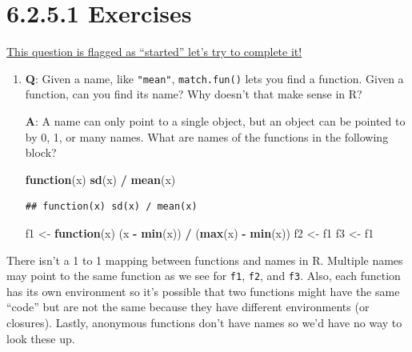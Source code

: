 \documentclass[]{book}
\newenvironment{Shaded}{\begin{snugshade}}{\end{snugshade}}
\newcommand{\ControlFlowTok}[1]{\textcolor[rgb]{0.13,0.29,0.53}{\textbf{#1}}}
\newcommand{\KeywordTok}[1]{\textcolor[rgb]{0.13,0.29,0.53}{\textbf{#1}}}
\newcommand{\NormalTok}[1]{#1}
\newcommand{\OperatorTok}[1]{\textcolor[rgb]{0.81,0.36,0.00}{\textbf{#1}}}
\newcommand{\StringTok}[1]{\textcolor[rgb]{0.31,0.60,0.02}{#1}}
\begin{document}
\hypertarget{exercises-2}{%
\section*{6.2.5.1 Exercises}\label{exercises-2}}

\href{https://github.com/Tazinho/Advanced-R-Solutions/blob/5043d9b06c7469a010c568ecb85e12bedca75207/2-06-Functions.Rmd\#L9}{This question is flagged as ``started'' let's try to complete it!}

\begin{enumerate}
\def\labelenumi{\arabic{enumi}.}
\item
  \textbf{{Q}}: Given a name, like \texttt{"mean"}, \texttt{match.fun()} lets you find a function. Given a function, can you find its name? Why doesn't that make sense in R?

  \textbf{{A}}: A name can only point to a single object, but an object can be pointed to by 0, 1, or many names. What are names of the functions in the following block?

\begin{Shaded}
\begin{Highlighting}[]
  \ControlFlowTok{function}\NormalTok{(x) }\KeywordTok{sd}\NormalTok{(x) }\OperatorTok{/}\StringTok{ }\KeywordTok{mean}\NormalTok{(x)}
\end{Highlighting}
\end{Shaded}

\begin{verbatim}
## function(x) sd(x) / mean(x)
\end{verbatim}

\begin{Shaded}
\begin{Highlighting}[]
\NormalTok{  f1 <-}\StringTok{ }\ControlFlowTok{function}\NormalTok{(x) (x }\OperatorTok{-}\StringTok{ }\KeywordTok{min}\NormalTok{(x)) }\OperatorTok{/}\StringTok{ }\NormalTok{(}\KeywordTok{max}\NormalTok{(x) }\OperatorTok{-}\StringTok{ }\KeywordTok{min}\NormalTok{(x))}
\NormalTok{  f2 <-}\StringTok{ }\NormalTok{f1}
\NormalTok{  f3 <-}\StringTok{ }\NormalTok{f1}
\end{Highlighting}
\end{Shaded}
\end{enumerate}

There isn't a 1 to 1 mapping between functions and names in R. Multiple names may point to the same function as we see for \texttt{f1}, \texttt{f2}, and \texttt{f3}. Also, each function has its own environment so it's possible that two functions might have the same ``code'' but are not the same because they have different environments (or closures). Lastly, anonymous functions don't have names so we'd have no way to look these up.
\end{document}
